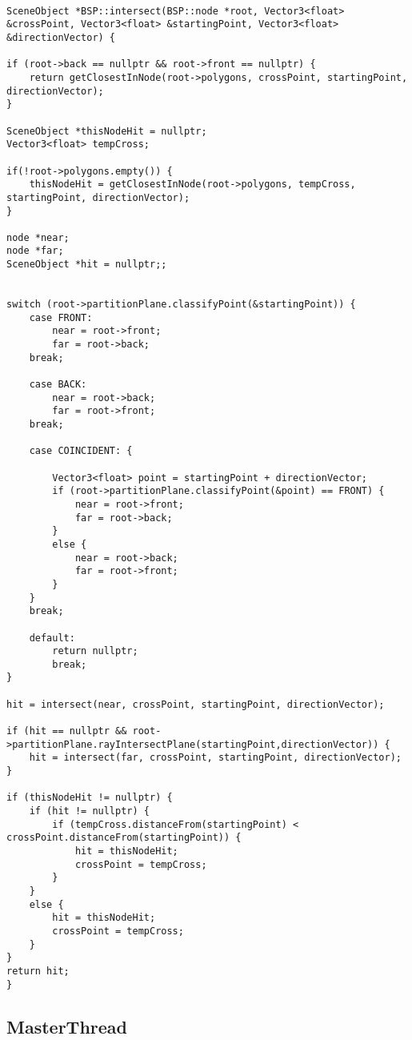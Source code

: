 \begin{lstlisting}

SceneObject *BSP::intersect(BSP::node *root, Vector3<float> &crossPoint, Vector3<float> &startingPoint, Vector3<float> &directionVector) {

if (root->back == nullptr && root->front == nullptr) {
    return getClosestInNode(root->polygons, crossPoint, startingPoint, directionVector);
}

SceneObject *thisNodeHit = nullptr;
Vector3<float> tempCross;

if(!root->polygons.empty()) {
    thisNodeHit = getClosestInNode(root->polygons, tempCross, startingPoint, directionVector);
}

node *near;
node *far;
SceneObject *hit = nullptr;;


switch (root->partitionPlane.classifyPoint(&startingPoint)) {
    case FRONT:
        near = root->front;
        far = root->back;
    break;

    case BACK:
        near = root->back;
        far = root->front;
    break;

    case COINCIDENT: {

        Vector3<float> point = startingPoint + directionVector;
        if (root->partitionPlane.classifyPoint(&point) == FRONT) {
            near = root->front;
            far = root->back;
        }
        else {
            near = root->back;
            far = root->front;
        }
    }
    break;

    default:
        return nullptr;
        break;
}

hit = intersect(near, crossPoint, startingPoint, directionVector);

if (hit == nullptr && root->partitionPlane.rayIntersectPlane(startingPoint,directionVector)) {
    hit = intersect(far, crossPoint, startingPoint, directionVector);
}

if (thisNodeHit != nullptr) {
    if (hit != nullptr) {
        if (tempCross.distanceFrom(startingPoint) < crossPoint.distanceFrom(startingPoint)) {
            hit = thisNodeHit;
            crossPoint = tempCross;
        }
    }
    else {
        hit = thisNodeHit;
        crossPoint = tempCross;
    }
}
return hit;
}

\end{lstlisting}

\subsection{MasterThread}
	
